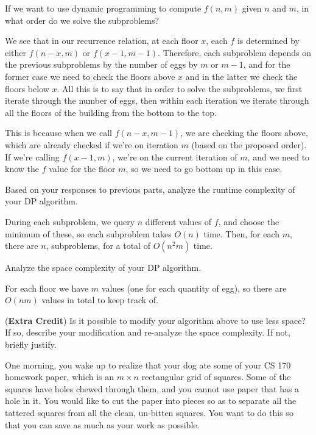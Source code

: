 \documentclass[11pt]{article}
\begin{document}
\begin{subparts}
\subpart If we want to use dynamic programming to compute $f(n, m)$ given $n$ and $m$, in what
order do we solve the subproblems?

\begin{solution}
	We see that in our recurrence relation, at each floor $x$, each $f$ is determined by either $f(n - x, m)$ 
	or $f(x -1, m-1)$. 
	Therefore, each subproblem depends on the previous subproblems by the number of eggs by $m$ or $m-1$, and 
	for the former case we need to check the floors above $x$ and in the latter we check the floors below $x$. 
	All this is to say that in order to solve the subproblems, we first iterate through the number of eggs, 
	then within each iteration we iterate through all the floors of the building from the bottom to the top. 

	This is because when we call $f(n-x, m-1)$, we are checking the floors above, which are already checked 
	if we're on iteration $m$ (based on the proposed order). If we're calling $f(x-1, m)$, we're on the current
	iteration of $m$, and we need to know the \( f \) value for the floor $m$, so we need to go bottom up 
	in this case. 
\end{solution}

\subpart Based on your responses to previous parts, analyze the runtime complexity of your DP algorithm.

\begin{solution}
	During each subproblem, we query $n$ different values of $f$, and choose the minimum of these, so each 
	subproblem takes $O(n)$ time. Then, for each $m$, there are $n$, subproblems, for a total of $O(n^2 m)$ 
	time. 
\end{solution}

\subpart Analyze the space complexity of your DP algorithm.

\begin{solution}
	For each floor we have $m$ values (one for each quantity of egg), so there are $O(nm)$ values 
	in total to keep track of.
\end{solution}

\subpart (\textbf{Extra Credit}) Is it possible to modify your algorithm above to use less space? If so, describe your modification and re-analyze the space complexity. If not, briefly justify. 
\end{subparts}

\newpage
{} One morning, you wake up to realize that your dog ate some of your CS 170 homework paper, which is an $m \times n$ rectangular grid of squares. Some of the squares have holes chewed through them, and you cannot use paper that has a hole in it. You would like to cut the paper into pieces so as to
separate all the tattered squares from all the clean, un-bitten squares. You want to do this so that you can save as much as your work as possible.
\end{document}
